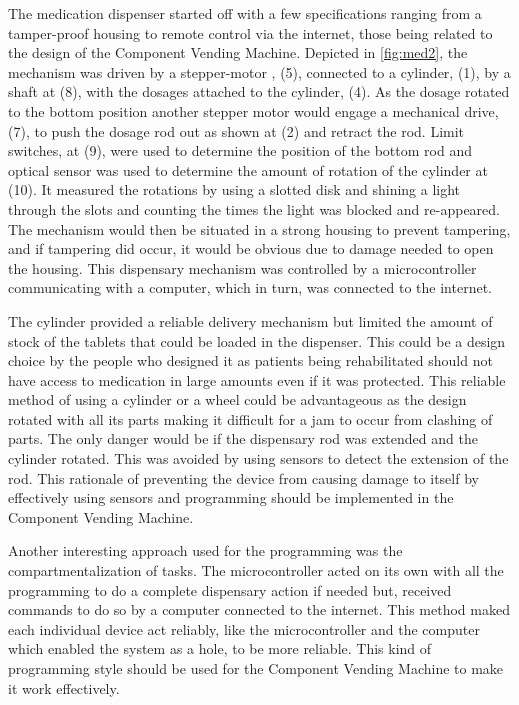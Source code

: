 \documentclass[a4paper,11pt]{article}
\newcommand*{\halfref}[1]{\hyperref[{#1}]{\autoref*{#1}}}
\numberwithin{figure}{section}
\numberwithin{table}{section}
\begin{document}
The medication dispenser started off with a few specifications ranging from a tamper-proof housing to remote control via the internet, those being related to the design of the Component Vending Machine. Depicted in  \halfref{fig:med2}, the mechanism was driven by a stepper-motor , (5), connected to a cylinder, (1), by a shaft at (8), with the dosages attached to the cylinder, (4). As the dosage rotated to the bottom position another stepper motor would engage a mechanical drive, (7), to push the dosage rod out as shown at (2) and retract the rod. Limit switches, at (9), were used to determine the position of the bottom rod and optical sensor was used to determine the amount of rotation of the cylinder at (10). It measured the rotations by using a slotted disk and shining a light through the slots and counting the times the light was blocked and re-appeared. The mechanism would then be situated in a strong housing to prevent tampering, and if tampering did occur, it would be obvious due to damage needed to open the housing. This dispensary mechanism was controlled by a microcontroller communicating with a computer, which in turn, was connected to the internet. 

The cylinder provided a reliable delivery mechanism but limited the amount of stock of the tablets that could be loaded in the dispenser. This could be a design choice by the people who designed it as patients being rehabilitated should not have access to medication in large amounts even if it was protected. This reliable method of using a cylinder or a wheel could be advantageous as the design rotated with all its parts making it difficult for a jam to occur from clashing of parts. The only danger would be if the dispensary rod was extended and the cylinder rotated. This was avoided by using sensors to detect the extension of the rod. This rationale of preventing the device from causing damage to itself by effectively using sensors and programming should be implemented in the Component Vending Machine.

Another interesting approach used for the programming was the compartmentalization of tasks. The microcontroller acted on its own with all the programming to do a complete dispensary action if needed but, received commands to do so by a computer connected to the internet. This method maked each individual device act reliably, like the microcontroller and the computer which enabled the system as a hole, to be more reliable. This kind of programming style should be used for the Component Vending Machine to make it work effectively.
\end{document}
